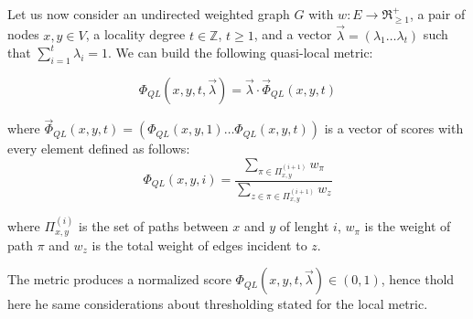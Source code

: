 Let us now consider an undirected weighted graph $G$ with $w:E\rightarrow\Re_{\geq1}^{+}$, a pair of nodes $x,y\in V$, a locality degree $t\in \mathbb{Z}$, $t\geq 1$, and a vector $\vec{\lambda}=(\lambda_{1}\ldots\lambda_{t})$ such that $\sum_{i=1}^{t}\lambda_{i}=1$.
We can build the following quasi-local metric:

\begin{equation}
\label{eqn:detection-quasi-local-1}
\Phi_{QL}(x,y,t,\vec{\lambda})=\vec{\lambda}\cdot\vec{\Phi}_{QL}(x,y,t)
\end{equation}

where $\vec{\Phi}_{QL}(x,y,t)=(\Phi_{QL}(x,y,1)\ldots\Phi_{QL}(x,y,t))$ is a vector of scores with every element defined as follows:
\begin{equation}
\label{eqn:detection-quasi-local-2}
\Phi_{QL}(x,y,i)=
\frac{\sum\limits_{\pi\in\Pi_{x,y}^{(i+1)}}w_{\pi}}
{\sum\limits_{z\in\pi\in\Pi_{x,y}^{(i+1)}}w_{z}}
\end{equation}

where $\Pi_{x,y}^{(i)}$ is the set of paths between $x$ and $y$ of lenght $i$,
$w_{\pi}$ is the weight of path $\pi$ and
$w_{z}$ is the total weight of edges incident to $z$.

The metric produces a normalized score $\Phi_{QL}(x,y,t,\vec{\lambda})\in(0,1)$, hence thold here he same considerations about thresholding stated for the local metric.